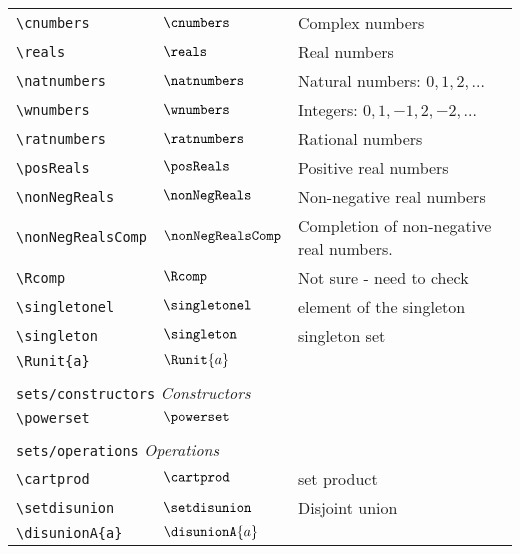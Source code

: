 \begin{longtable}{lll}
 \hline
{\color[rgb]{0.5,0.5,0.5}\texttt{\textbackslash cnumbers}} & $\cnumbers$ &  Complex numbers\\ 
 {\color[rgb]{0.5,0.5,0.5}\texttt{\textbackslash reals}} & $\reals$ &  Real numbers\\ 
 {\color[rgb]{0.5,0.5,0.5}\texttt{\textbackslash natnumbers}} & $\natnumbers$ &  Natural numbers: $0, 1, 2, \dots$\\ 
 {\color[rgb]{0.5,0.5,0.5}\texttt{\textbackslash wnumbers}} & $\wnumbers$ &  Integers: $0, 1, -1, 2, -2, \dots$\\ 
 {\color[rgb]{0.5,0.5,0.5}\texttt{\textbackslash ratnumbers}} & $\ratnumbers$ &  Rational numbers\\ 
 {\color[rgb]{0.5,0.5,0.5}\texttt{\textbackslash posReals}} & $\posReals$ &  Positive real numbers\\ 
 {\color[rgb]{0.5,0.5,0.5}\texttt{\textbackslash nonNegReals}} & $\nonNegReals$ &  Non-negative real numbers\\ 
 {\color[rgb]{0.5,0.5,0.5}\texttt{\textbackslash nonNegRealsComp}} & $\nonNegRealsComp$ &  Completion of non-negative real numbers.\\ 
 {\color[rgb]{0.5,0.5,0.5}\texttt{\textbackslash Rcomp}} & $\Rcomp$ &  Not sure - need to check\\ 
 {\color[rgb]{0.5,0.5,0.5}\texttt{\textbackslash singletonel}} & $\singletonel$ &  element of the singleton\\ 
 {\color[rgb]{0.5,0.5,0.5}\texttt{\textbackslash singleton}} & $\singleton$ &  singleton set\\ 
 {\color[rgb]{0.5,0.5,0.5}\texttt{\textbackslash Runit\{a\}}} & $\Runit{a}$ & \\ 
  &  & \\ 
 \multicolumn{3}{l}{{\color[rgb]{0.5,0.5,0.5}\texttt{sets/constructors}} \emph{Constructors}}\\ 
 \hline
{\color[rgb]{0.5,0.5,0.5}\texttt{\textbackslash powerset}} & $\powerset$ & \\ 
  &  & \\ 
 \multicolumn{3}{l}{{\color[rgb]{0.5,0.5,0.5}\texttt{sets/operations}} \emph{Operations}}\\ 
 \hline
{\color[rgb]{0.5,0.5,0.5}\texttt{\textbackslash cartprod}} & $\cartprod$ &  set product\\ 
 {\color[rgb]{0.5,0.5,0.5}\texttt{\textbackslash setdisunion}} & $\setdisunion$ &  Disjoint union\\ 
 {\color[rgb]{0.5,0.5,0.5}\texttt{\textbackslash disunionA\{a\}}} & $\disunionA{a}$ & \\ 

\end{longtable}
